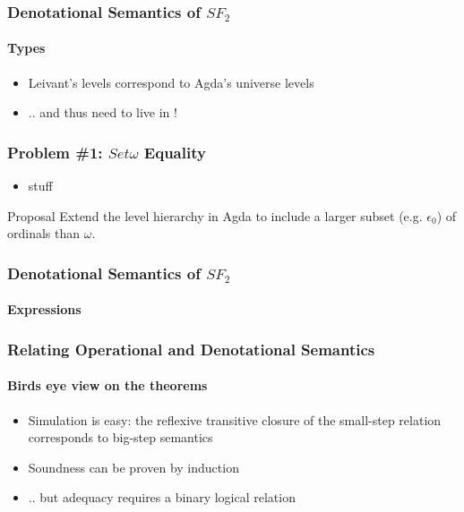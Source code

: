 \documentclass[dvipsnames,aspectratio=169,pdftex]{beamer}
\begin{document}
\begin{frame}
  \frametitle{Denotational Semantics of $SF_2$}
  \framesubtitle{Types}
  \TFTEnv
  \TFTSem
  \begin{itemize}
    \item Leivant’s levels correspond to Agda’s universe levels
    \item .. and thus  need to live in !
  \end{itemize}
\end{frame}

\begin{frame}
  \frametitle{Problem \#1: $Set \omega$ Equality}
  \NormalEqDef
  \OmegaEqDef
  \begin{itemize}
    \item stuff
  \end{itemize}
  \begin{exampleblock}{Proposal}
    Extend the level hierarchy in Agda to include a larger subset (e.g. $\epsilon_0$) of ordinals than $\omega$.
  \end{exampleblock}
\end{frame}

\begin{frame}
  \frametitle{Denotational Semantics of $SF_2$}
  \framesubtitle{Expressions}
  \TFVEnv
  \TFExprSem
\end{frame}

\begin{frame}[fragile]
  \frametitle{Relating Operational and Denotational Semantics}
  \framesubtitle{Birds eye view on the theorems}
    \vspace{5mm}
    \begin{itemize}
      \item Simulation is easy: the reflexive transitive closure of the small-step relation corresponds to big-step semantics
      \item Soundness can be proven by induction
      \item .. but adequacy requires a binary logical relation 
    \end{itemize}
\end{frame}
\end{document}
